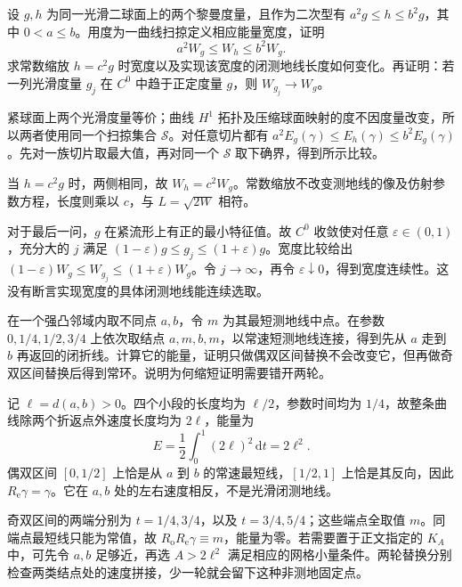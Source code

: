 \begin{optionalexercise}\label{g3:ex:curve-width-metric-comparison}
	设 \(g,h\) 为同一光滑二球面上的两个黎曼度量，且作为二次型有 \(a^2g\le h\le b^2g\)，其中 \(0<a\le b\)。用度为一曲线扫掠定义相应能量宽度，证明
	\[
		a^2W_g\le W_h\le b^2W_g.
	\]
	求常数缩放 \(h=c^2g\) 时宽度以及实现该宽度的闭测地线长度如何变化。再证明：若一列光滑度量 \(g_j\) 在 \(C^0\) 中趋于正定度量 \(g\)，则 \(W_{g_j}\to W_g\)。
\end{optionalexercise}
\begin{solution}
	紧球面上两个光滑度量等价；曲线 \(H^1\) 拓扑及压缩球面映射的度不因度量改变，所以两者使用同一个扫掠集合 \(\mathscr S\)。对任意切片都有 \(a^2E_g(\gamma)\le E_h(\gamma)\le b^2E_g(\gamma)\)。先对一族切片取最大值，再对同一个 \(\mathscr S\) 取下确界，得到所示比较。

	当 \(h=c^2g\) 时，两侧相同，故 \(W_h=c^2W_g\)。常数缩放不改变测地线的像及仿射参数方程，长度则乘以 \(c\)，与 \(L=\sqrt{2W}\) 相符。

	对于最后一问，\(g\) 在紧流形上有正的最小特征值。故 \(C^0\) 收敛使对任意 \(\varepsilon\in(0,1)\)，充分大的 \(j\) 满足 \((1-\varepsilon)g\le g_j\le(1+\varepsilon)g\)。宽度比较给出 \((1-\varepsilon)W_g\le W_{g_j}\le(1+\varepsilon)W_g\)。令 \(j\to\infty\)，再令 \(\varepsilon\downarrow0\)，得到宽度连续性。这没有断言实现宽度的具体闭测地线能连续选取。
\end{solution}

\begin{optionalexercise}\label{g3:ex:birkhoff-one-round-fixed}
	在一个强凸邻域内取不同点 \(a,b\)，令 \(m\) 为其最短测地线中点。在参数 \(0,1/4,1/2,3/4\) 上依次取结点 \(a,m,b,m\)，以常速短测地线连接，得到先从 \(a\) 走到 \(b\) 再返回的闭折线。计算它的能量，证明只做偶双区间替换不会改变它，但再做奇双区间替换后得到常环。说明为何缩短证明需要错开两轮。
\end{optionalexercise}
\begin{solution}
	记 \(\ell=d(a,b)>0\)。四个小段的长度均为 \(\ell/2\)，参数时间均为 \(1/4\)，故整条曲线除两个折返点外速度长度均为 \(2\ell\)，能量为
	\[
		E=\frac12\int_0^1(2\ell)^2\,\mathrm dt=2\ell^2.
	\]
	偶双区间 \([0,1/2]\) 上恰是从 \(a\) 到 \(b\) 的常速最短线，\([1/2,1]\) 上恰是其反向，因此 \(R_{\mathrm e}\gamma=\gamma\)。它在 \(a,b\) 处的左右速度相反，不是光滑闭测地线。

	奇双区间的两端分别为 \(t=1/4,3/4\)，以及 \(t=3/4,5/4\)；这些端点全取值 \(m\)。同端点最短线只能为常值，故 \(R_{\mathrm o}R_{\mathrm e}\gamma\equiv m\)，能量为零。若需要置于正文指定的 \(K_A\) 中，可先令 \(a,b\) 足够近，再选 \(A>2\ell^2\) 满足相应的网格小量条件。两轮替换分别检查两类结点处的速度拼接，少一轮就会留下这种非测地固定点。
\end{solution}


